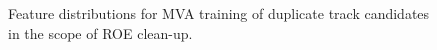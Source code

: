 \begin{figure}[H]
\caption{Feature distributions for MVA training of duplicate track candidates in the scope of ROE clean-up.}
\end{figure}

